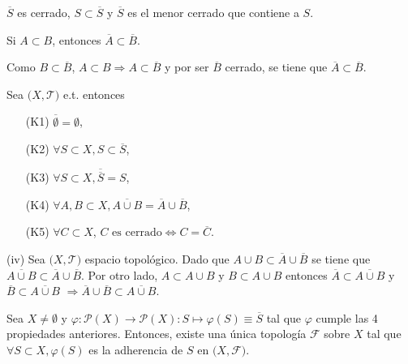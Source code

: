 \begin{obs}
  $\overline{S}$ es cerrado, $S \subset \overline{S}$ y $\overline{S}$ es el menor cerrado que contiene a $S$.
\end{obs}

\begin{lem}
  Si $A \subset B$, entonces $ \overline{A} \subset \overline{B}$.
\end{lem}

\begin{dem}
  Como $B \subset \overline{B}$, $A \subset B \Rightarrow A \subset \overline{B}$ y por ser $\overline{B}$ cerrado, se tiene que $\overline{A} \subset \overline{B}$.
\end{dem}

\begin{prop}
  Sea $\big( X, \mathcal{T} \big)$ e.t. entonces
  \begin{enumerate}[label=(\roman*)]
    \item [(K1)] $\overline{\emptyset} =  \emptyset$,
    \item [(K2)] $\forall S \subset X, S \subset \overline{S}$,
    \item [(K3)] $\forall S \subset X, \overline{\overline{S}} = S$,
    \item [(K4)] $\forall A,B \subset X, \overline{A \cup B} = \overline{A} \cup \overline{B}$,
    \item [(K5)] $\forall C \subset X$, $C \text{ es cerrado} \Leftrightarrow C = \overline{C}$.
  \end{enumerate}
\end{prop}

\begin{dem}(iv)
  Sea $\big( X, \mathcal{T} \big)$ espacio topológico. Dado que $A \cup B \subset \overline{A} \cup \overline{B}$ se tiene que $ \overline{A \cup B} \subset \overline{A} \cup \overline{B}$. Por otro lado, $A \subset A \cup B$ y $B \subset A \cup B$ entonces $\overline{A} \subset \overline{A \cup B}$ y $\overline{B} \subset \overline{A \cup B}$ $\Rightarrow \overline{A} \cup \overline{B} \subset \overline{A \cup B}$.
\end{dem}

\begin{theo}
  Sea $ X \neq \emptyset$ y $ \varphi: \mathcal{P}(X) \to \mathcal{P}(X) : S \mapsto \varphi (S) \equiv \overline{S}$ tal que $\varphi$ cumple las 4 propiedades anteriores. Entonces, existe una única topología $\mathcal{F}$ sobre $X$ tal que $\forall S \subset X, \varphi(S)$ es la adherencia de $S$ en $\big( X, \mathcal{F} \big)$.
\end{theo}

